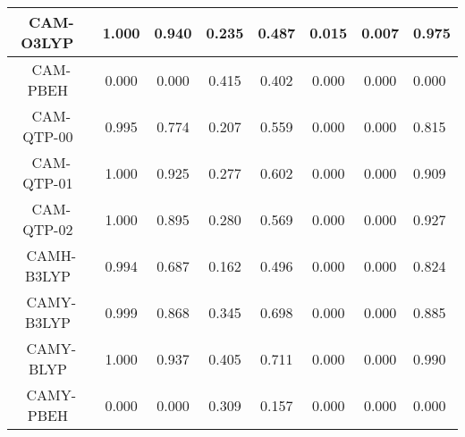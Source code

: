 \begin{tabular}{|c|c|c|c|c|c|c|l|}
                                CAM-O3LYP~\cite{Bircher2018_3184} &                1.000 &                          0.940 &             0.235 &                        0.487 &                0.015 &                0.007 &                       0.975 \\ \hline
                                  CAM-PBEH~\cite{Chen2018_073803} &                0.000 &                          0.000 &             0.415 &                        0.402 &                0.000 &                0.000 &                       0.000 \\ \hline
                               CAM-QTP-00~\cite{Verma2014_18A534} &                0.995 &                          0.774 &             0.207 &                        0.559 &                0.000 &                0.000 &                       0.815 \\ \hline
                                 CAM-QTP-01~\cite{Jin2016_034107} &                1.000 &                          0.925 &             0.277 &                        0.602 &                0.000 &                0.000 &                       0.909 \\ \hline
                             CAM-QTP-02~\cite{Haiduke2018_184106} &                1.000 &                          0.895 &             0.280 &                        0.569 &                0.000 &                0.000 &                       0.927 \\ \hline
                                   CAMH-B3LYP~\cite{Shao2020_587} &                0.994 &                          0.687 &             0.162 &                        0.496 &                0.000 &                0.000 &                       0.824 \\ \hline
                                   CAMY-B3LYP~\cite{Seth2012_901} &                0.999 &                          0.868 &             0.345 &                        0.698 &                0.000 &                0.000 &                       0.885 \\ \hline
                                 CAMY-BLYP~\cite{Akinaga2008_348} &                1.000 &                          0.937 &             0.405 &                        0.711 &                0.000 &                0.000 &                       0.990 \\ \hline
                                 CAMY-PBEH~\cite{Chen2018_073803} &                0.000 &                          0.000 &             0.309 &                        0.157 &                0.000 &                0.000 &                       0.000 \\ \hline

\end{tabular}

